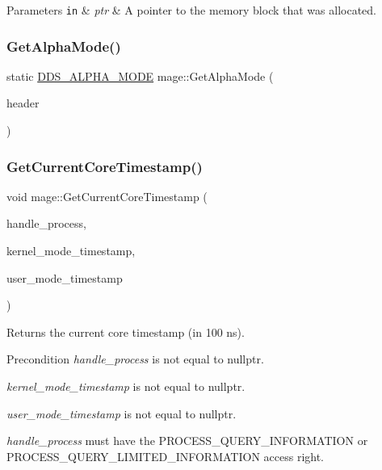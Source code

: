 \begin{DoxyParams}[1]{Parameters}
\mbox{\tt in}  & {\em ptr} & A pointer to the memory block that was allocated. \\
\hline
\end{DoxyParams}
\hypertarget{namespacemage_afcc0891e1660f8457696cb30f4ee518a}{}\label{namespacemage_afcc0891e1660f8457696cb30f4ee518a} 
\subsubsection{\texorpdfstring{Get\+Alpha\+Mode()}{GetAlphaMode()}}
{\footnotesize\ttfamily static \hyperlink{namespacemage_a0c586a2bad862f4858900ca121ca80c2}{D\+D\+S\+\_\+\+A\+L\+P\+H\+A\+\_\+\+M\+O\+DE} mage\+::\+Get\+Alpha\+Mode (\begin{DoxyParamCaption}\item[{\+\_\+\+In\+\_\+ const \hyperlink{structmage_1_1_d_d_s___h_e_a_d_e_r}{D\+D\+S\+\_\+\+H\+E\+A\+D\+ER} $\ast$}]{header }\end{DoxyParamCaption})\hspace{0.3cm}{\ttfamily [static]}}

\hypertarget{namespacemage_a1c830fb0bc11bc1f71585a4dad01c1db}{}\label{namespacemage_a1c830fb0bc11bc1f71585a4dad01c1db} 
\subsubsection{\texorpdfstring{Get\+Current\+Core\+Timestamp()}{GetCurrentCoreTimestamp()}\hspace{0.1cm}{\footnotesize\ttfamily [1/2]}}
{\footnotesize\ttfamily void mage\+::\+Get\+Current\+Core\+Timestamp (\begin{DoxyParamCaption}\item[{H\+A\+N\+D\+LE}]{handle\+\_\+process,  }\item[{uint64\+\_\+t $\ast$}]{kernel\+\_\+mode\+\_\+timestamp,  }\item[{uint64\+\_\+t $\ast$}]{user\+\_\+mode\+\_\+timestamp }\end{DoxyParamCaption})}

Returns the current core timestamp (in 100 ns).

\begin{DoxyPrecond}{Precondition}
{\itshape handle\+\_\+process} is not equal to {\ttfamily nullptr}. 

{\itshape kernel\+\_\+mode\+\_\+timestamp} is not equal to {\ttfamily nullptr}. 

{\itshape user\+\_\+mode\+\_\+timestamp} is not equal to {\ttfamily nullptr}. 

{\itshape handle\+\_\+process} must have the {\ttfamily P\+R\+O\+C\+E\+S\+S\+\_\+\+Q\+U\+E\+R\+Y\+\_\+\+I\+N\+F\+O\+R\+M\+A\+T\+I\+ON} or {\ttfamily P\+R\+O\+C\+E\+S\+S\+\_\+\+Q\+U\+E\+R\+Y\+\_\+\+L\+I\+M\+I\+T\+E\+D\+\_\+\+I\+N\+F\+O\+R\+M\+A\+T\+I\+ON} access right. 
\end{DoxyPrecond}

